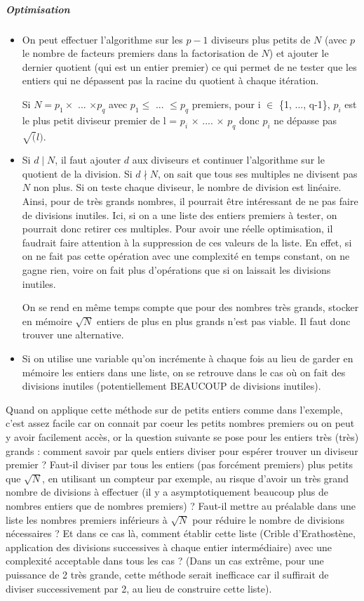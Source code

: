 \documentclass[11pt,a4paper]{article}
\begin{document}
	\subparagraph{Optimisation}
	\begin{itemize}	
		\item On peut effectuer l'algorithme sur les $p-1$ diviseurs plus petits de $N$ (avec $p$ le nombre de facteurs premiers dans la factorisation de $N$) et ajouter le dernier quotient (qui est un entier premier) ce qui permet de ne tester que les entiers qui ne dépassent pas la racine du quotient à chaque itération.
		
		Si $N = p_1 \times$ ... $\times p_q$ avec $p_1 \leq$ ... $\leq p_q$ premiers, pour i $\in$ \{1, ..., q-1\}, $p_i$ est le plus petit diviseur premier de l = $p_i$ $\times$ .... $\times$ $p_q$ donc $p_i$ ne dépasse pas $\sqrt(l)$.
		
		\item Si $d \mid N$, il faut ajouter $d$ aux diviseurs et continuer l'algorithme sur le quotient de la division. Si $d \nmid N$, on sait que tous ses multiples ne divisent pas $N$ non plus. Si on teste chaque diviseur, le nombre de division est linéaire. Ainsi, pour de très grands nombres, il pourrait être intéressant de ne pas faire de divisions inutiles. Ici, si on a une liste des entiers premiers à tester, on pourrait donc retirer ces multiples. Pour avoir une réelle optimisation, il faudrait faire attention à la suppression de ces valeurs de la liste. En effet, si on ne fait pas cette opération avec une complexité en temps constant, on ne gagne rien, voire on fait plus d'opérations que si on laissait les divisions inutiles. 
		
		On se rend en même temps compte que pour des nombres très grands, stocker en mémoire $\sqrt{N}$ entiers de plus en plus grands n'est pas viable. Il faut donc trouver une alternative.
		
		\item Si on utilise une variable qu'on incrémente à chaque fois au lieu de garder en mémoire les entiers dans une liste, on se retrouve dans le cas où on fait des divisions inutiles (potentiellement BEAUCOUP de divisions inutiles).
	\end{itemize}
	
	
	Quand on applique cette méthode sur de petits entiers comme dans l'exemple, c'est assez facile car on connait par coeur les petits nombres premiers ou on peut y avoir facilement accès, or la question suivante se pose pour les entiers très (très) grands : comment savoir par quels entiers diviser pour espérer trouver un diviseur premier ? Faut-il diviser par tous les entiers (pas forcément premiers) plus petits que $\sqrt{N}$, en utilisant un compteur par exemple, au risque d'avoir un très grand nombre de divisions à effectuer (il y a asymptotiquement beaucoup plus de nombres entiers que de nombres premiers) ? Faut-il mettre au préalable dans une liste les nombres premiers inférieurs à $\sqrt{N}$ pour réduire le nombre de divisions nécessaires ? Et dans ce cas là, comment établir cette liste (Crible d'Erathostène, application des divisions successives à chaque entier intermédiaire) avec une complexité acceptable dans tous les cas ? (Dans un cas extrême, pour une puissance de 2 très grande, cette méthode serait inefficace car il suffirait de diviser successivement par 2, au lieu de construire cette liste).
	
\end{document}
